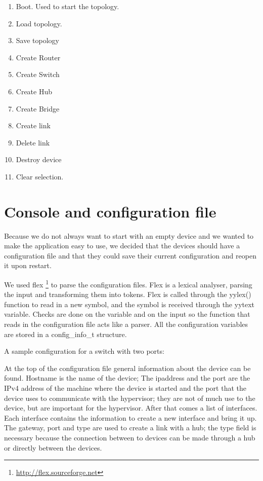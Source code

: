 \begin{enumerate}
  \item Boot. Used to start the topology. 
  \item Load topology. 
  \item Save topology
  \item Create Router
  \item Create Switch
  \item Create Hub
  \item Create Bridge
  \item Create link
  \item Delete link
  \item Destroy device
  \item Clear selection. 
\end{enumerate}

\section{Console and configuration file}
\label{sec:dev-conf}

Because we do not always want to start with an empty device and we wanted to make the application easy to use, we decided that the
devices should have a configuration file and that they could save their current configuration and reopen it upon restart. 

We used flex \footnote{\url{http://flex.sourceforge.net}} to parse the configuration files. Flex is a lexical analyser, 
parsing the input and transforming them into tokens. Flex is called through the yylex() function to read in a new symbol, and the
symbol is received through the yytext variable. Checks are done on the variable and on the input so the function that reads in 
the configuration file acts like a parser. All the configuration variables are stored in a config_info_t structure.

A sample configuration for a switch with two ports:
\lstset{language=text,caption=Example switch configuration file,label=lst:dconf}


At the top of the configuration file general information about the device can be found. Hostname is the name of the device;
The ipaddress and the port are the IPv4 address of the machine where the device is started and the port that the device
uses to communicate with the hypervisor; they are not of much use to the device, but are important for the hypervisor.
After that comes a list of interfaces.	Each interface contains the information to create a new interface and bring it up.
The gateway, port and type are used to create a link with a hub; the type field is necessary because the connection between
to devices can be made through a hub or directly between the devices. 

